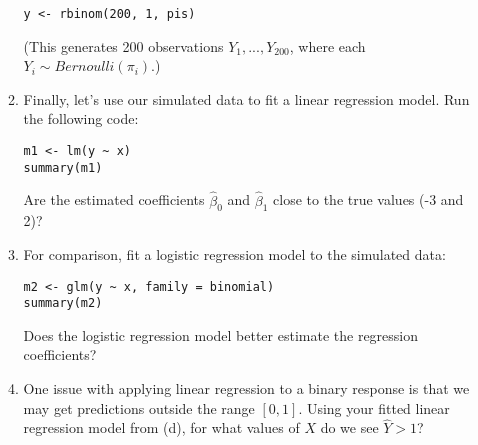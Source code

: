 \documentclass[11pt]{article}
\begin{document}
\begin{enumerate}
\begin{enumerate}
\begin{verbatim}
y <- rbinom(200, 1, pis)
\end{verbatim}

(This generates 200 observations $Y_1,...,Y_{200}$, where each $Y_i \sim Bernoulli(\pi_i)$.) 

\item Finally, let's use our simulated data to fit a linear regression model. Run the following code:

\begin{verbatim}
m1 <- lm(y ~ x) 
summary(m1)
\end{verbatim}

Are the estimated coefficients $\widehat{\beta}_0$ and $\widehat{\beta}_1$ close to the true values (-3 and 2)?

\item For comparison, fit a logistic regression model to the simulated data:

\begin{verbatim}
m2 <- glm(y ~ x, family = binomial) 
summary(m2)
\end{verbatim}

Does the logistic regression model better estimate the regression coefficients?

\item One issue with applying linear regression to a binary response is that we may get predictions outside the range $[0, 1]$. Using your fitted linear regression model from (d), for what values of $X$ do we see $\widehat{Y} > 1$?

\end{enumerate}

\end{enumerate}
\end{document}
